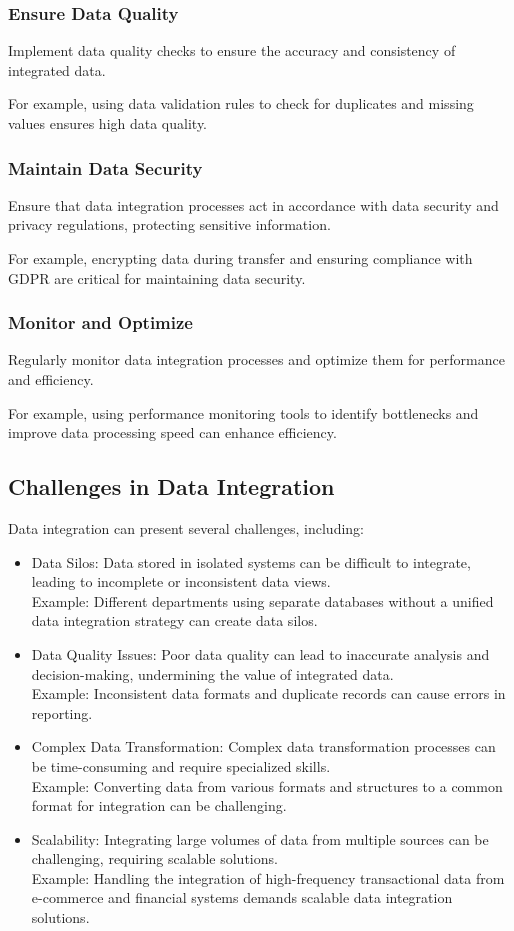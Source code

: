 \documentclass[12pt]{book}
\begin{document}
\subsubsection{Ensure Data Quality}
Implement data quality checks to ensure the accuracy and consistency of integrated data.

For example, using data validation rules to check for duplicates and missing values ensures high data quality.

\subsubsection{Maintain Data Security}
Ensure that data integration processes act in accordance with data security and privacy regulations, protecting sensitive information.

For example, encrypting data during transfer and ensuring compliance with GDPR are critical for maintaining data security.

\subsubsection{Monitor and Optimize}
Regularly monitor data integration processes and optimize them for performance and efficiency.

For example, using performance monitoring tools to identify bottlenecks and improve data processing speed can enhance efficiency.

\subsection{Challenges in Data Integration}
Data integration can present several challenges, including:

\begin{itemize}
    \item Data Silos: Data stored in isolated systems can be difficult to integrate, leading to incomplete or inconsistent data views.\\
    Example: Different departments using separate databases without a unified data integration strategy can create data silos. 
    \item Data Quality Issues: Poor data quality can lead to inaccurate analysis and decision-making, undermining the value of integrated data.\\
    Example: Inconsistent data formats and duplicate records can cause errors in reporting.
    \item Complex Data Transformation: Complex data transformation processes can be time-consuming and require specialized skills.\\
    Example: Converting data from various formats and structures to a common format for integration can be challenging.
    \item Scalability: Integrating large volumes of data from multiple sources can be challenging, requiring scalable solutions.\\
    Example: Handling the integration of high-frequency transactional data from e-commerce and financial systems demands scalable data integration solutions.
\end{itemize}
\end{document}
